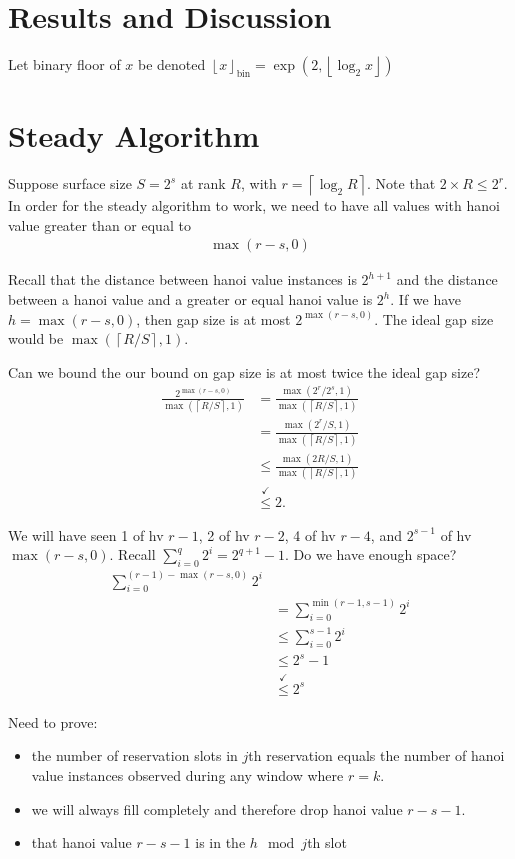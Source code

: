 \section{Results and Discussion} \label{sec:results}

Let binary floor of $x$ be denoted $\left\lfloor x \right\rfloor_\mathrm{bin} = \exp(2, \left\lfloor \log_2 x \right\rfloor)$

\section{Steady Algorithm}

Suppose surface size $S = 2^s$ at rank $R$, with $r = \left\lceil \log_2 R \right\rceil$.
Note that $2 \times R \leq 2^r$.
In order for the steady algorithm to work, we need to have all values with hanoi value greater than or equal to
\begin{align*}
\max(r - s, 0)
\end{align*}

Recall that the distance between hanoi value instances is $2^{h + 1}$ and the distance between a hanoi value and a greater or equal hanoi value is $2^h$.
If we have $h = \max (r - s, 0)$, then gap size is at most $2^{\max(r - s, 0)}$.
The ideal gap size would be $\max( \left\lceil R / S \right\rceil, 1)$.

Can we bound the our bound on gap size is at most twice the ideal gap size?
\begin{align*}
\frac{
  2^{\max(r - s, 0)}
}{
  \max(\left\lceil R / S \right\rceil, 1)
}
&=
\frac{
  \max(2^r / 2^s, 1)
}{
  \max(\left\lceil R / S \right\rceil, 1)
} \\
&=
\frac{
  \max(2^r / S, 1)
}{
  \max(\left\lceil R / S \right\rceil, 1)
} \\
&\leq
\frac{
  \max(2R / S, 1)
}{
  \max(\left\lceil R / S \right\rceil, 1)
} \\
&\stackrel{\checkmark}{\leq} 2.
\end{align*}

We will have seen 1 of hv $r - 1$, 2 of hv $r - 2$, 4 of hv $r - 4$, and $2 ^ {s - 1}$ of hv $\max(r - s, 0)$.
Recall $\sum_{i = 0}^{q} 2^i = 2 ^ {q + 1} - 1$.
Do we have enough space?
\begin{align*}
\sum_{i = 0}^{(r - 1) - \max(r - s, 0)} 2 ^ i \\
&= \sum_{i = 0}^{\min(r - 1, s - 1)} 2 ^ i \\
&\leq \sum_{i = 0}^{s - 1} 2 ^ i \\
&\leq 2^s - 1\\
&\stackrel{\checkmark}{\leq} 2^s
\end{align*}

Need to prove:
\begin{itemize}
\item the number of reservation slots in $j$th reservation equals the number of hanoi value instances observed during any window where  $r = k$.
\item we will always fill completely and therefore drop hanoi value $r - s - 1$.
\item that hanoi value $r - s - 1$ is in the $h \mod j$th slot
\end{itemize}
